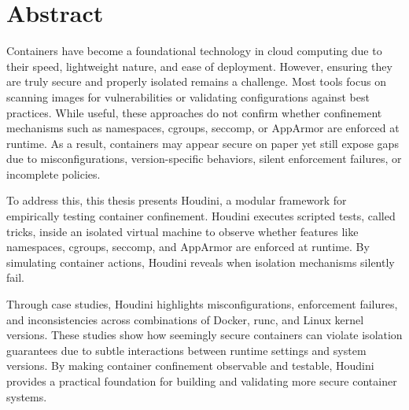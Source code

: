 \chapter*{Abstract}
\fontsize{12pt}{14pt} \selectfont
\begin{doublespace}
Containers have become a foundational technology in cloud computing due to their speed, lightweight nature, and ease of deployment. However, ensuring they are truly secure and properly isolated remains a challenge. Most tools focus on scanning images for vulnerabilities or validating configurations against best practices. While useful, these approaches do not confirm whether confinement mechanisms such as namespaces, cgroups, seccomp, or AppArmor are enforced at runtime. As a result, containers may appear secure on paper yet still expose gaps due to misconfigurations, version-specific behaviors, silent enforcement failures, or incomplete policies.

To address this, this thesis presents Houdini, a modular framework for empirically testing container confinement. Houdini executes scripted tests, called tricks, inside an isolated virtual machine to observe whether features like namespaces, cgroups, seccomp, and AppArmor are enforced at runtime. By simulating container actions, Houdini reveals when isolation mechanisms silently fail.

Through case studies, Houdini highlights misconfigurations, enforcement failures, and inconsistencies across combinations of Docker, runc, and Linux kernel versions. These studies show how seemingly secure containers can violate isolation guarantees due to subtle interactions between runtime settings and system versions. By making container confinement observable and testable, Houdini provides a practical foundation for building and validating more secure container systems.

\end{doublespace}